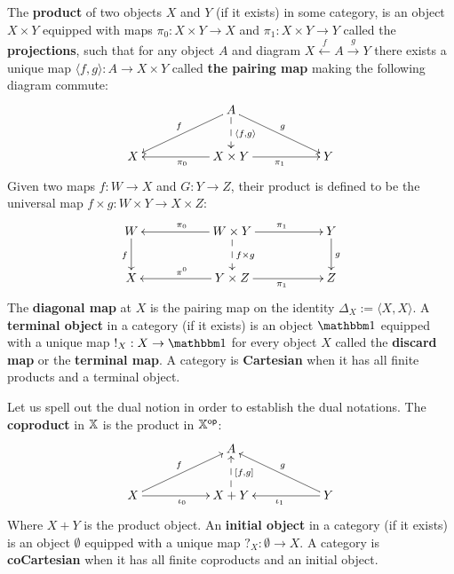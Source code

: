\begin{definition}
\label{def:cart}
The {\bf product} of two objects $X$ and $Y$ (if it exists) in some category, is an object $X\times Y$ equipped with maps $\pi_0:X\times Y\to X $ and $\pi_1:X\times Y \to Y$ called the {\bf projections},  such that for any object $A$ and diagram  $X \xleftarrow{f} A \xrightarrow{g} Y$ there exists a unique map $\langle  f, g \rangle :A \to X\times Y$ called {\bf the pairing map} making the following diagram commute:
$$
\xymatrix{
    &
    & A \ar[lld]_f \ar[rrd]^g \ar@{-->}[d]^{\langle f,g\rangle}
    &
    &
  \\X 
    &
    & X\times Y \ar[ll]^{\pi_0} \ar[rr]_{\pi_1}
    &
    & Y
}
$$ 
Given two maps $f:W\to X$ and $G:Y\to Z$, their product is defined to be the universal map $f\times g:W\times Y \to X\times Z$: 
$$
\xymatrix{
    W \ar[d]_f
    &
    & W\times Y \ar@{-->}[d]^{f\times g} \ar[ll]_{\pi_0} \ar[rr]^{\pi_1}
    &
    & Y \ar[d]^g
  \\X
    &
    & Y\times Z  \ar[ll]_{\pi^0} \ar[rr]_{\pi_1}
    &
    &Z
}
$$
The {\bf diagonal map} at $X$ is the pairing map on the identity $\Delta_X:=\langle X,X\rangle$.  A {\bf terminal object} in a category (if it exists) is an object $\one$ equipped with a unique map $!_X:X\to \one$ for every object $X$ called the {\bf discard map} or the {\bf terminal map}.
A category is  {\bf Cartesian} when it has all finite products and a terminal object. %





Let us spell out the dual notion in order to establish the dual notations.
The {\bf coproduct} in $\mathbb{X}$ is the product in $\mathbb{X}^{\mathsf{op}}$:
$$
\xymatrix{
    &
    & A
    &
    &
  \\X \ar[urr]^{f} \ar[rr]_{\iota_0}
    &
    & X+  Y \ar@{-->}[u]_{[f,g]} 
    &
    & Y\ar[ull]_{g}  \ar[ll]^{\iota_1}
}
$$ 
Where $ X+  Y $ is the product object.%
An {\bf initial object} in a category (if it exists) is an object $\emptyset$ equipped with a unique map $?_X: \emptyset\to  X$. %
A category is  {\bf coCartesian} when it has all finite coproducts and an initial object.%
\end{definition}

